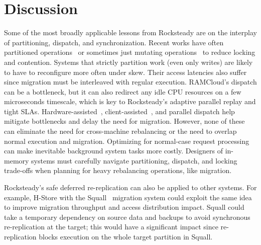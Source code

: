 \section{Discussion} 


Some of the most broadly applicable lessons from Rocksteady are on the
interplay of partitioning, dispatch, and synchronization. Recent works have
often partitioned operations~\cite{hstore,redis} or sometimes just mutating
operations~\cite{mica} to reduce locking and contention.  Systems that strictly
partition work (even only writes) are likely to have to reconfigure more often
under skew.  Their access latencies also suffer since migration must be
interleaved with regular execution.  RAMCloud's dispatch can be a bottleneck,
but it can also redirect any idle CPU resources on a few microseconds timescale,
which is key to Rocksteady's adaptive parallel replay and tight SLAs.
Hardware-assisted~\cite{flexnic}, client-assisted~\cite{mica}, and parallel dispatch help
mitigate bottlenecks and delay the need for migration. However, none of these can
eliminate the need for cross-machine rebalancing or the need to overlap normal
execution and migration.
%
Optimizing for normal-case request processing can make inevitable
background system tasks more costly.  Designers of in-memory systems must
carefully navigate partitioning, dispatch, and locking trade-offs when planning
for heavy rebalancing operations, like migration.

Rocksteady's safe deferred re-replication can also be applied to other systems.
For example, H-Store with the Squall~\cite{squall} migration system could
exploit the same idea to improve migration throughput and access distribution
impact.  Squall could take a temporary dependency on source data and backups to
avoid synchronous re-replication at the target; this would have a significant
impact since re-replication blocks execution on the whole target partition in
Squall.

%
%
%
%
%
%

